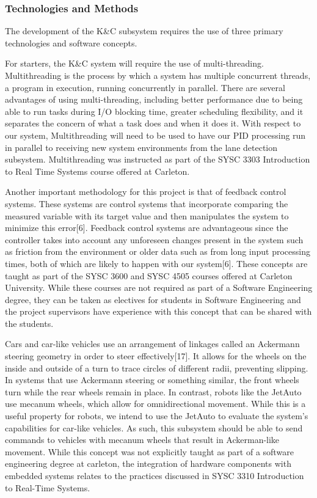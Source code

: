 \documentclass[titlepage]{article}
\begin{document}
\subsubsection{Technologies and Methods}
The development of the K\&C subsystem requires the use of three primary technologies and software concepts.

For starters, the K\&C system will require the use of multi-threading. Multithreading is the process by which a system has multiple concurrent threads, a program in execution, running concurrently in parallel. There are several advantages of using multi-threading, including better performance due to being able to run tasks during I/O blocking time, greater scheduling flexibility, and it separates the concern of what a task does and when it does it. With respect to our system, Multithreading will need to be used to have our PID processing run in parallel to receiving new system environments from the lane detection subsystem. Multithreading was instructed as part of the SYSC 3303 Introduction to Real Time Systems course offered at Carleton.

Another important methodology for this project is that of feedback control systems. These systems are control systems that incorporate comparing the measured variable with its target value and then manipulates the system to minimize this error[6]. Feedback control systems are advantageous since the controller takes into account any unforeseen changes present in the system such as friction from the environment or older data such as from long input processing times, both of which are likely to happen with our system[6]. These concepts are taught as part of the SYSC 3600 and SYSC 4505 courses offered at Carleton University. While these courses are not required as part of a Software Engineering degree, they can be taken as electives for students in Software Engineering and the project supervisors have experience with this concept that can be shared with the students.

Cars and car-like vehicles use an arrangement of linkages called an Ackermann steering geometry in order to steer effectively[17]. It allows for the wheels on the inside and outside of a turn to trace circles of different radii, preventing slipping. In systems that use Ackermann steering or something similar, the front wheels turn while the rear wheels remain in place. In contrast, robots like the JetAuto use mecanum wheels, which allow for omnidirectional movement. While this is a useful property for robots, we intend to use the JetAuto to evaluate the system’s capabilities for car-like vehicles. As such, this subsystem should be able to send commands to vehicles with mecanum wheels that result in Ackerman-like movement. While this concept was not explicitly taught as part of a software engineering degree at carleton, the integration of hardware components with embedded systems relates to the practices discussed in SYSC 3310 Introduction to Real-Time Systems.
\end{document}
